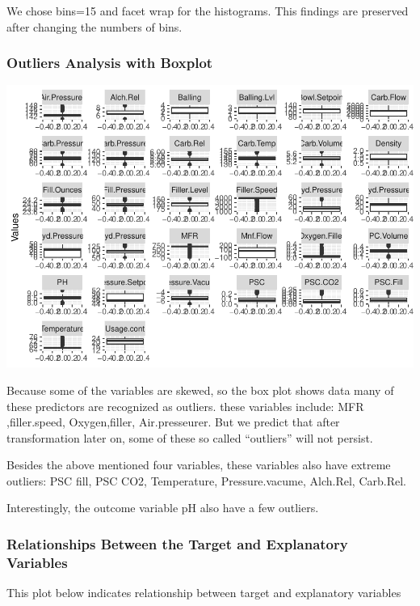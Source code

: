 \documentclass[]{article}
\begin{document}
We chose bins=15 and facet wrap for the histograms. This findings are
preserved after changing the numbers of bins.

\subsubsection{Outliers Analysis with
Boxplot}\label{outliers-analysis-with-boxplot}

\begin{center}\includegraphics{OmerOzeren_GracieHan_Project_2_files/figure-latex/unnamed-chunk-8-1} \end{center}

Because some of the variables are skewed, so the box plot shows data
many of these predictors are recognized as outliers. these variables
include: MFR ,filler.speed, Oxygen,filler, Air.presseurer. But we
predict that after transformation later on, some of these so called
``outliers'' will not persist.

Besides the above mentioned four variables, these variables also have
extreme outliers: PSC fill, PSC CO2, Temperature, Pressure.vacume,
Alch.Rel, Carb.Rel.

Interestingly, the outcome variable pH also have a few outliers.

\subsubsection{Relationships Between the Target and Explanatory
Variables}\label{relationships-between-the-target-and-explanatory-variables}

This plot below indicates relationship between target and explanatory
variables
\end{document}
